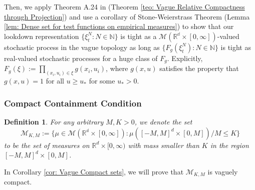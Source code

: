 \documentclass[12pt]{article}
\newtheorem{definition}[theorem]{Definition}
\begin{document}
Then, we apply Theorem A.24 in \cite{kallenberg1997foundations}
(Theorem \ref{teo: Vague Relative Compactness through Projection})
and use a corollary of Stone-Weierstrass Theorem
(Lemma \ref{lem: Dense set for test functions on empirical measures})
to show that our lookdown representation $\{\xi^N_t: N \in \mathbb{N}\}$ is tight
as a $\mathcal{M}(\mathbb{R^d} \times [0, \infty])$-valued stochastic process
in the vague topology
as long as $\{F_g(\xi^N_t): N \in \mathbb{N}\}$ is tight
as real-valued stochastic processes for a huge class of $F_g$. 
Explicitly, $F_g(\xi):= \prod_{(x_i,u_i)\in \xi}g(x_i,u_i)$,
where $g(x,u)$ satisfies the property that
$g(x,u) = 1 $
for all $u \geq u_{*}$ for some $u_{*}>0$.

\subsubsection{Compact Containment Condition}
\begin{definition}
For any arbitrary $M,K>0$, 
we denote the set 
$$\mathcal{M}_{K,M}:= \{\mu \in \mathcal{M}(\mathbb{R^d} \times [0, \infty]): \mu([-M,M]^d \times [0,M])/M \leq K\}$$
to be the set of measures on $\mathbb{R}^d \times[0,\infty)$ with mass smaller than $K$ in the region $[-M,M]^d \times [0,M]$.
\end{definition}

In Corollary \ref{cor: Vague Compact sets}, we will prove that $\mathcal{M}_{K,M}$ is vaguely compact. 
\end{document}
